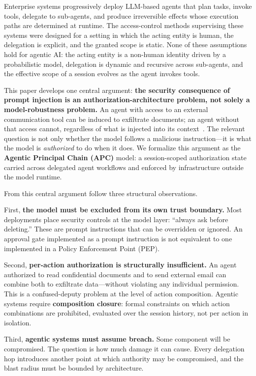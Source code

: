 \documentclass[sigconf,nonacm]{acmart}
\begin{document}
Enterprise systems progressively deploy LLM-based agents that plan tasks, invoke tools, delegate to sub-agents, and produce irreversible effects whose execution paths are determined at runtime. The access-control methods supervising these systems were designed for a setting in which the acting entity is human, the delegation is explicit, and the granted scope is static. None of these assumptions hold for agentic AI: the acting entity is a non-human identity driven by a probabilistic model, delegation is dynamic and recursive across sub-agents, and the effective scope of a session evolves as the agent invokes tools.

This paper develops one central argument: \textbf{the security consequence of prompt injection is an authorization-architecture problem, not solely a model-robustness problem.} An agent with access to an external communication tool can be induced to exfiltrate documents; an agent without that access cannot, regardless of what is injected into its context~\cite{ruan2024, debenedetti2024}. The relevant question is not only whether the model follows a malicious instruction---it is what the model is \emph{authorized} to do when it does. We formalize this argument as the \textbf{Agentic Principal Chain (APC)} model: a session-scoped authorization state carried across delegated agent workflows and enforced by infrastructure outside the model runtime.

From this central argument follow three structural observations.

First, \textbf{the model must be excluded from its own trust boundary.} Most deployments place security controls at the model layer: ``always ask before deleting.'' These are prompt instructions that can be overridden or ignored. An approval gate implemented as a prompt instruction is not equivalent to one implemented in a Policy Enforcement Point (PEP).

Second, \textbf{per-action authorization is structurally insufficient.} An agent authorized to read confidential documents and to send external email can combine both to exfiltrate data---without violating any individual permission. This is a confused-deputy problem at the level of action composition. Agentic systems require \textbf{composition closure}: formal constraints on which action combinations are prohibited, evaluated over the session history, not per action in isolation.

Third, \textbf{agentic systems must assume breach.} Some component will be compromised. The question is how much damage it can cause. Every delegation hop introduces another point at which authority may be compromised, and the blast radius must be bounded by architecture.
\end{document}
